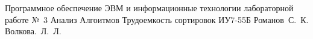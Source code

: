 \documentclass{bmstu}
\begin{document}
{Программное обеспечение ЭВМ и информационные технологии}
{лабораторной работе №~3}
{Анализ Алгоитмов}
{Трудоемкость сортировок}
{}
{ИУ7-55Б}
{Романов~С.~К.}
{Волкова.~Л.~Л.}









%

\makebibliography
\end{document}
